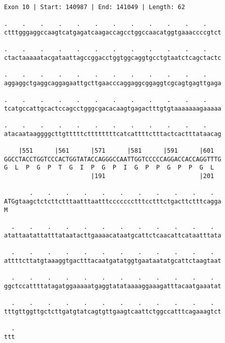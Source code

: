 \documentclass{article}
\begin{document}
\begin{Verbatim}
Exon 10 | Start: 140987 | End: 141049 | Length: 62
 
.    .    .    .    .    .    .    .    .    .    .    .    
ctttgggaggccaagtcatgagatcaagaccagcctggccaacatggtgaaaccccgtct
  
.    .    .    .    .    .    .    .    .    .    .    .    
ctactaaaaatacgataattagccggacctggtggcaggtgcctgtaatctcagctactc
  
.    .    .    .    .    .    .    .    .    .    .    .    
aggaggctgaggcaggagaattgcttgaacccaggaggcggaggtcgcagtgagttgaga
  
.    .    .    .    .    .    .    .    .    .    .    .    
tcatgccattgcactccagcctgggcgacacaagtgagactttgtgtaaaaaaagaaaaa
  
.    .    .    .    .    .    .    .    .    .    .    .    
atacaataaggggcttgtttttcttttttttcatcattttctttactcactttataacag
  
    |551      |561      |571      |581      |591      |601  
GGCCTACCTGGTCCCACTGGTATACCAGGGCCAATTGGTCCCCCAGGACCACCAGGTTTG
G  L  P  G  P  T  G  I  P  G  P  I  G  P  P  G  P  P  G  L  
                        |191                          |201  
  
       .    .    .    .    .    .    .    .    .    .    .  
ATGgtaagctctcttctttaatttaatttccccccctttcctttctgacttctttcagga
M                                                           
  
  .    .    .    .    .    .    .    .    .    .    .    .  
atattaatattatttataatacttgaaaacataatgcattctcaacattcataatttata
  
  .    .    .    .    .    .    .    .    .    .    .    .  
attttcttatgtaaaggtgactttacaatgatatggtgaataatatgcattctaagtaat
  
  .    .    .    .    .    .    .    .    .    .    .    .  
ggctccattttatagatggaaaaatgaggtatataaaaggaaagatttacaatgaaatat
  
  .    .    .    .    .    .    .    .    .    .    .    .  
tttgttggttgctcttgatgtatcagtgttgaagtcaattctggccatttcagaaagtct
  
  .
ttt
\end{Verbatim}
\newpage
\end{document}
